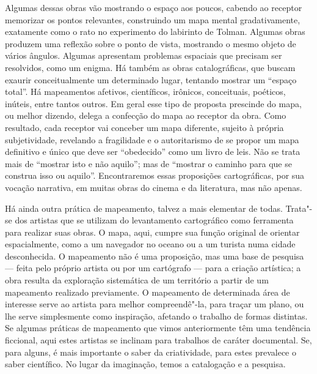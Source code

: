 Algumas dessas obras vão mostrando o espaço aos poucos, cabendo ao
receptor memorizar os pontos relevantes, construindo um mapa mental
gradativamente, exatamente como o rato no experimento do labirinto de
Tolman. Algumas obras produzem uma reflexão sobre o ponto de vista,
mostrando o mesmo objeto de vários ângulos. Algumas apresentam problemas
espaciais que precisam ser resolvidos, como um enigma. Há também as
obras catalográficas, que buscam exaurir conceitualmente um determinado
lugar, tentando mostrar um ``espaço total''. Há mapeamentos afetivos,
científicos, irônicos, conceituais, poéticos, inúteis, entre tantos
outros. Em geral esse tipo de proposta prescinde do mapa, ou melhor
dizendo, delega a confecção do mapa ao receptor da obra. Como resultado,
cada receptor vai conceber um mapa diferente, sujeito à própria
subjetividade, revelando a fragilidade e o autoritarismo de se propor um
mapa definitivo e único que deve ser ``obedecido'' como um livro de
leis. Não se trata mais de ``mostrar isto e não aquilo''; mas de
``mostrar o caminho para que se construa isso ou aquilo''. Encontraremos
essas proposições cartográficas, por sua vocação narrativa, em muitas
obras do cinema e da literatura, mas não apenas.

Há ainda outra prática de mapeamento, talvez a mais elementar de todas.
Trata"-se dos artistas que se utilizam do levantamento cartográfico como
ferramenta para realizar suas obras. O mapa, aqui, cumpre sua função
original de orientar espacialmente, como a um navegador no oceano ou a
um turista numa cidade desconhecida. O mapeamento não é uma proposição,
mas uma base de pesquisa --- feita pelo próprio artista ou por um
cartógrafo --- para a criação artística; a obra resulta da exploração
sistemática de um território a partir de um mapeamento realizado
previamente. O mapeamento de determinada área de interesse serve ao
artista para melhor compreendê"-la, para traçar um plano, ou lhe serve
simplesmente como inspiração, afetando o trabalho de formas distintas.
Se algumas práticas de mapeamento que vimos anteriormente têm uma
tendência ficcional, aqui estes artistas se inclinam para trabalhos de
caráter documental. Se, para alguns, é mais importante o saber da
criatividade, para estes prevalece o saber científico. No lugar da
imaginação, temos a catalogação e a pesquisa.

